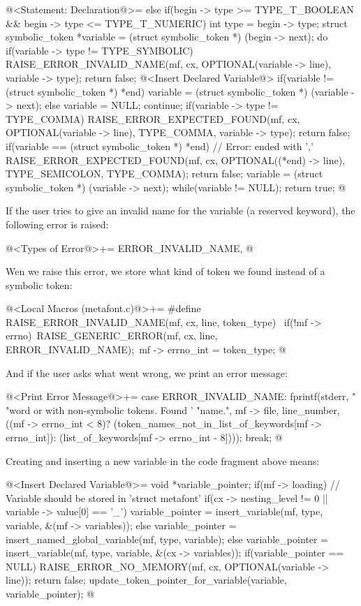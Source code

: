 \iniciocodigo
@<Statement: Declaration@>=
else if(begin -> type >= TYPE_T_BOOLEAN && begin -> type <= TYPE_T_NUMERIC){
  int type = begin -> type;
  struct symbolic_token *variable = (struct symbolic_token *) (begin -> next);
  do{
    if(variable -> type != TYPE_SYMBOLIC){
      RAISE_ERROR_INVALID_NAME(mf, cx, OPTIONAL(variable -> line),
                               variable -> type);
      return false;
    }
    @<Insert Declared Variable@>
    if(variable != (struct symbolic_token *) *end)
      variable = (struct symbolic_token *) (variable -> next);
    else{
      variable = NULL;
      continue;
    }
    if(variable -> type != TYPE_COMMA){
      RAISE_ERROR_EXPECTED_FOUND(mf, cx, OPTIONAL(variable -> line),
                                 TYPE_COMMA, variable -> type);
      return false;
    }
    if(variable == (struct symbolic_token *) *end){ // Error: ended with ','
      RAISE_ERROR_EXPECTED_FOUND(mf, cx, OPTIONAL((*end) -> line),
                                 TYPE_SEMICOLON, TYPE_COMMA);
      return false;
    }
    variable = (struct symbolic_token *) (variable -> next);
  } while(variable != NULL);
  return true;
}
@
\fimcodigo

If the user tries to give an invalid name for the variable (a reserved
keyword), the following error is raised:

\iniciocodigo
@<Types of Error@>+=
ERROR_INVALID_NAME,
@
\fimcodigo

Wen we raise this error, we store what kind of token we found instead
of a symbolic token:

\iniciocodigo
@<Local Macros (metafont.c)@>+=
#define RAISE_ERROR_INVALID_NAME(mf, cx, line, token_type) {\
  if(!mf -> errno){\
    RAISE_GENERIC_ERROR(mf, cx, line, ERROR_INVALID_NAME);\
    mf -> errno_int = token_type;}}
@
\fimcodigo

And if the user asks what went wrong, we print an error message:

\iniciocodigo
@<Print Error Message@>+=
case ERROR_INVALID_NAME:
  fprintf(stderr, "%
          "word or with non-symbolic tokens. Found '%
          "name.", mf -> file, line_number,
          ((mf -> errno_int < 8)?
          (token_names_not_in_list_of_keywords[mf -> errno_int]):
          (list_of_keywords[mf -> errno_int - 8])));
  break;
@
\fimcodigo

Creating and inserting a new variable in the code fragment above
means:

\iniciocodigo
@<Insert Declared Variable@>=
{
  void *variable_pointer;
  if(mf -> loading){ // Variable should be stored in 'struct metafont'
    if(cx -> nesting_level != 0 || variable -> value[0] == '_')
      variable_pointer = insert_variable(mf, type, variable,
                                         &(mf -> variables));
    else
      variable_pointer = insert_named_global_variable(mf, type, variable);
  }
  else
    variable_pointer = insert_variable(mf, type, variable, &(cx -> variables));
  if(variable_pointer == NULL){
    RAISE_ERROR_NO_MEMORY(mf, cx, OPTIONAL(variable -> line));
    return false;
  }
  update_token_pointer_for_variable(variable, variable_pointer);
}
@
\fimcodigo

